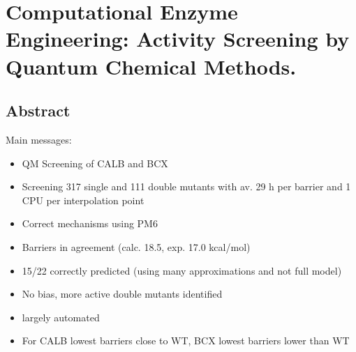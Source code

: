 \chapter[Computational Enzyme Engineering: Activity Screening by Quantum Chemical Methods.]
{Computational Enzyme Engineering: Activity Screening by Quantum Chemical Methods.\label{ch1}}


\section{Abstract}\label{sec:abstract}
Main messages:
\begin{itemize}
\item QM Screening of CALB and BCX
\item Screening 317 single and 111 double mutants with av. 29 h per barrier and 1 CPU per interpolation point
\item Correct mechanisms using PM6
\item Barriers in agreement (calc. 18.5, exp. 17.0 kcal/mol)
\item 15/22 correctly predicted (using many approximations and not full model)
\item No bias, more active double mutants identified
\item largely automated
\item For CALB lowest barriers close to WT, BCX lowest barriers lower than WT
\end{itemize}


